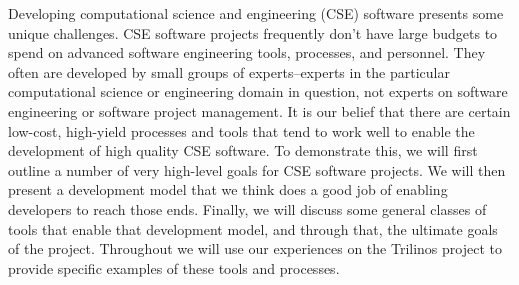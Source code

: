 \documentclass[12pt,relax]{article}
\begin{document}
%                                                                                
%                                                                                
                                                                                
                                                                                


Developing computational science and engineering (CSE) software presents some unique challenges.  CSE software projects frequently don't have large budgets to spend on advanced software engineering tools, processes, and personnel.  They often are developed by small groups of experts--experts in the particular computational science or engineering domain in question, not experts on software engineering or software project management.  It is our belief that there are certain low-cost, high-yield processes and tools that tend to work well to enable the development of high quality CSE software.  To demonstrate this, we will first outline a number of very high-level goals for CSE software projects.  We will then present a development model that we think does a good job of enabling developers to reach those ends.  Finally, we will discuss some general classes of tools that enable that development model, and through that, the ultimate goals of the project.  Throughout we will use our experiences on the Trilinos project to provide specific examples of these tools and processes.
\end{document}
